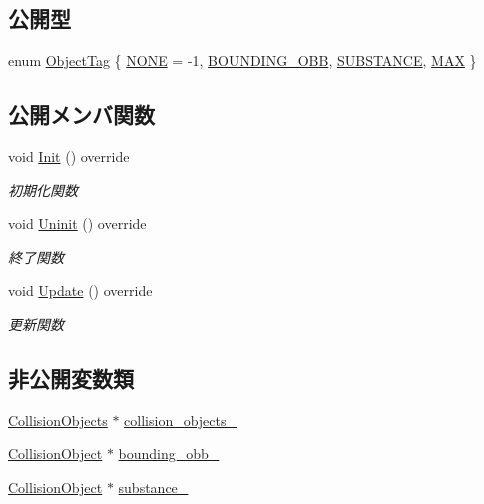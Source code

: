\subsection*{公開型}
\begin{DoxyCompactItemize}
\item 
enum \mbox{\hyperlink{class_coin_collision_ade7912345747f522fd895e87621ce049}{Object\+Tag}} \{ \mbox{\hyperlink{class_coin_collision_ade7912345747f522fd895e87621ce049aa520033eb3664c6f516082c22efd5d17}{N\+O\+NE}} = -\/1, 
\mbox{\hyperlink{class_coin_collision_ade7912345747f522fd895e87621ce049a003d6865c3e811586f2b96d25c4b6375}{B\+O\+U\+N\+D\+I\+N\+G\+\_\+\+O\+BB}}, 
\mbox{\hyperlink{class_coin_collision_ade7912345747f522fd895e87621ce049ab3dfdeacfa9cf71c167dfb2faec4612f}{S\+U\+B\+S\+T\+A\+N\+CE}}, 
\mbox{\hyperlink{class_coin_collision_ade7912345747f522fd895e87621ce049afe668be7d8cc9606f4c5be2220c38281}{M\+AX}}
 \}
\end{DoxyCompactItemize}
\subsection*{公開メンバ関数}
\begin{DoxyCompactItemize}
\item 
void \mbox{\hyperlink{class_coin_collision_a4119a7decab2410a4ada3568ad0c132d}{Init}} () override
\begin{DoxyCompactList}\small\item\em 初期化関数 \end{DoxyCompactList}\item 
void \mbox{\hyperlink{class_coin_collision_aa852afdcdbedcf82809df9c7fd99be9e}{Uninit}} () override
\begin{DoxyCompactList}\small\item\em 終了関数 \end{DoxyCompactList}\item 
void \mbox{\hyperlink{class_coin_collision_a981fd9b1b8c688a757a456a56d80501b}{Update}} () override
\begin{DoxyCompactList}\small\item\em 更新関数 \end{DoxyCompactList}\end{DoxyCompactItemize}
\subsection*{非公開変数類}
\begin{DoxyCompactItemize}
\item 
\mbox{\hyperlink{class_collision_objects}{Collision\+Objects}} $\ast$ \mbox{\hyperlink{class_coin_collision_a6a110ab9ad9acd6942a5725380443151}{collision\+\_\+objects\+\_\+}}
\item 
\mbox{\hyperlink{class_collision_object}{Collision\+Object}} $\ast$ \mbox{\hyperlink{class_coin_collision_ac604781e9ab6194c06bf9ca7f426bd95}{bounding\+\_\+obb\+\_\+}}
\item 
\mbox{\hyperlink{class_collision_object}{Collision\+Object}} $\ast$ \mbox{\hyperlink{class_coin_collision_a255c792770274eebf85df921467e6f1c}{substance\+\_\+}}
\end{DoxyCompactItemize}

